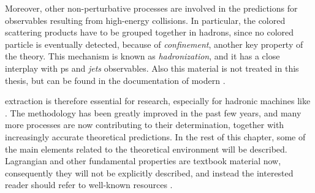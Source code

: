 Moreover, other non-perturbative processes are involved in the predictions for
observables resulting from high-energy collisions.
In particular, the colored scattering products have to be grouped together in
hadrons, since no colored particle is eventually detected, because of \qcd
\textit{confinement}, another key property of the theory.
%
This mechanism is known as \textit{hadronization}, and it has a close interplay
with \acrfull{ps} and \qcd \textit{jets} observables.
%
Also this material is not treated in this thesis, but can be found in the
documentation of modern  \cite{Bierlich:2022pfr,Bellm:2015jjp}.

\pdfs extraction is therefore essential for \hep research, especially for
hadronic machines like \lhc.
The methodology has been greatly improved in the past few years, and many more
processes are now contributing to their determination, together with
increasingly accurate theoretical predictions.
%
In the rest of this chapter, some of the main elements related to the \pdf
theoretical environment will be described.
\qcd Lagrangian and other fundamental properties are textbook material now,
consequently they will not be explicitly described, and instead the interested
reader should refer to well-known resources
\cite{Peskin:1995ev,Ellis:1996mzs,Campbell:2017hsr,Collins:2011zzd}.
